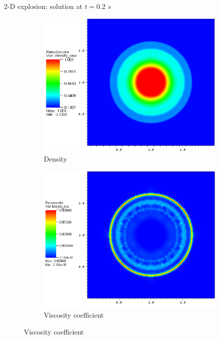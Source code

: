 \documentclass[xcolor=dvipsnames,10pt]{beamer}
\begin{document}
\begin{frame}{$2$-D explosion: solution at $t=0.2$ $s$}
\begin{figure}[H]
\begin{subfigure}[b]{0.45\textwidth}
\centering
\includegraphics[width=\textwidth]{../figures/Explosion_density_profiles.png}
\caption{Density}
\end{subfigure}
%
\begin{subfigure}[b]{0.45\textwidth}
\centering
\includegraphics[width=\textwidth]{../figures/Explosion_viscosity_profiles.png}
\caption{Viscosity coefficient}
\end{subfigure}
\end{figure}
\end{frame}
\end{document}
